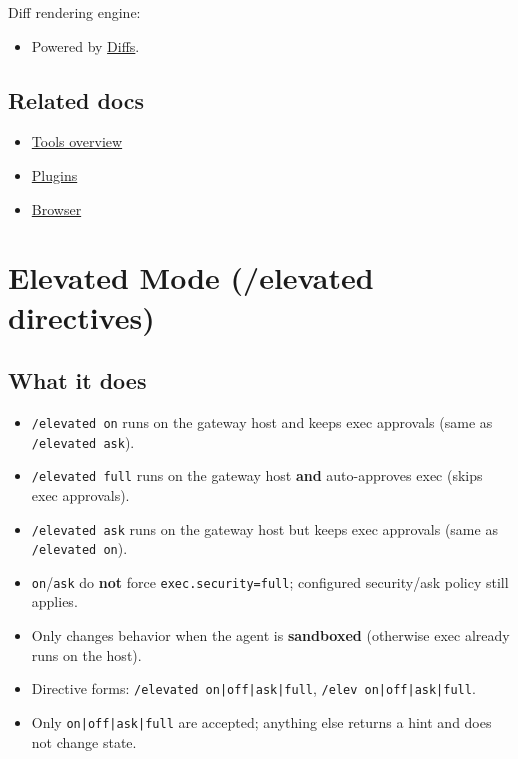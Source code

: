 Diff rendering engine:

\begin{itemize}
  \item Powered by \href{https://diffs.com}{Diffs}.
\end{itemize}


\subsection{Related docs}


\begin{itemize}
  \item \href{/tools}{Tools overview}
  \item \href{/tools/plugin}{Plugins}
  \item \href{/tools/browser}{Browser}
\end{itemize}



\clearpage

\section{Elevated Mode (/elevated directives)}


\subsection{What it does}


\begin{itemize}
  \item \texttt{/elevated on} runs on the gateway host and keeps exec approvals (same as \texttt{/elevated ask}).
  \item \texttt{/elevated full} runs on the gateway host \textbf{and} auto-approves exec (skips exec approvals).
  \item \texttt{/elevated ask} runs on the gateway host but keeps exec approvals (same as \texttt{/elevated on}).
  \item \texttt{on}/\texttt{ask} do \textbf{not} force \texttt{exec.security=full}; configured security/ask policy still applies.
  \item Only changes behavior when the agent is \textbf{sandboxed} (otherwise exec already runs on the host).
  \item Directive forms: \texttt{/elevated on|off|ask|full}, \texttt{/elev on|off|ask|full}.
  \item Only \texttt{on|off|ask|full} are accepted; anything else returns a hint and does not change state.
\end{itemize}


